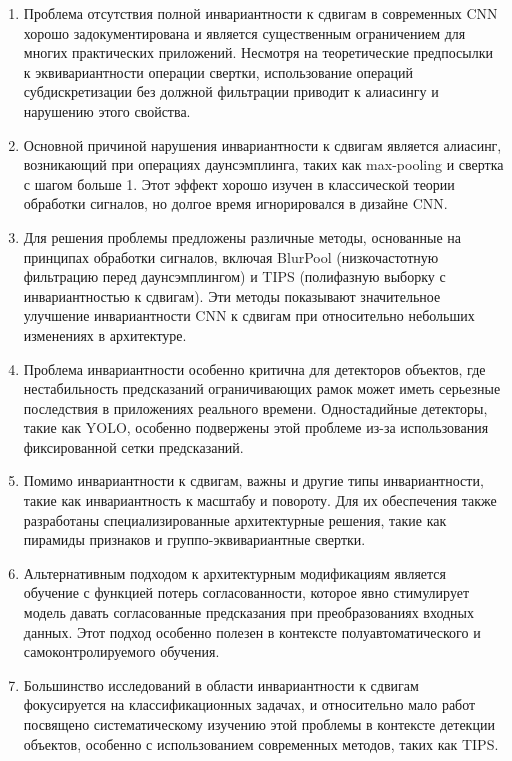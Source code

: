 \begin{enumerate}
    \item Проблема отсутствия полной инвариантности к сдвигам в современных CNN хорошо задокументирована и является существенным ограничением для многих практических приложений. Несмотря на теоретические предпосылки к эквивариантности операции свертки, использование операций субдискретизации без должной фильтрации приводит к алиасингу и нарушению этого свойства.
    
    \item Основной причиной нарушения инвариантности к сдвигам является алиасинг, возникающий при операциях даунсэмплинга, таких как max-pooling и свертка с шагом больше 1. Этот эффект хорошо изучен в классической теории обработки сигналов, но долгое время игнорировался в дизайне CNN.
    
    \item Для решения проблемы предложены различные методы, основанные на принципах обработки сигналов, включая BlurPool (низкочастотную фильтрацию перед даунсэмплингом) и TIPS (полифазную выборку с инвариантностью к сдвигам). Эти методы показывают значительное улучшение инвариантности CNN к сдвигам при относительно небольших изменениях в архитектуре.
    
    \item Проблема инвариантности особенно критична для детекторов объектов, где нестабильность предсказаний ограничивающих рамок может иметь серьезные последствия в приложениях реального времени. Одностадийные детекторы, такие как YOLO, особенно подвержены этой проблеме из-за использования фиксированной сетки предсказаний.
    
    \item Помимо инвариантности к сдвигам, важны и другие типы инвариантности, такие как инвариантность к масштабу и повороту. Для их обеспечения также разработаны специализированные архитектурные решения, такие как пирамиды признаков и группо-эквивариантные свертки.
    
    \item Альтернативным подходом к архитектурным модификациям является обучение с функцией потерь согласованности, которое явно стимулирует модель давать согласованные предсказания при преобразованиях входных данных. Этот подход особенно полезен в контексте полуавтоматического и самоконтролируемого обучения.
    
    \item Большинство исследований в области инвариантности к сдвигам фокусируется на классификационных задачах, и относительно мало работ посвящено систематическому изучению этой проблемы в контексте детекции объектов, особенно с использованием современных методов, таких как TIPS.
\end{enumerate}

